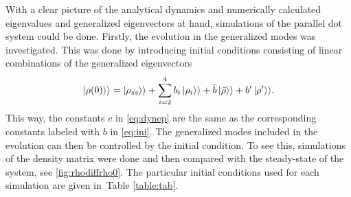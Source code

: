 \documentclass[../main.tex]{subfiles}
\begin{document}
With a clear picture of the analytical dynamics and numerically calculated eigenvalues and generalized eigenvectors at hand, simulations of the parallel dot system could be done. Firstly, the evolution in the generalized modes was investigated. This was done by introducing initial conditions consisting of linear combinations of the generalized eigenvectors
\begin{equation}\label{eq:ini}
    \ket{\rho(0)}\rangle = \ket{\rho_{ss}}\rangle + \sum_{i=2}^4 b_i\ket{\rho_i}\rangle + \bar b \ket{\bar\rho}\rangle + b'\ket{\rho'}\rangle.
\end{equation}
This way, the constants $c$ in \cref{eq:dynep} are the same as the corresponding constants labeled with $b$ in \cref{eq:ini}. The generalized modes included in the evolution can then be controlled by the initial condition. To see this, simulations of the density matrix were done and then compared with the steady-state of the system, see \cref{fig:rhodiffrho0}. The particular initial conditions used for each simulation are given in~Table \ref{table:tab}.
\end{document}
